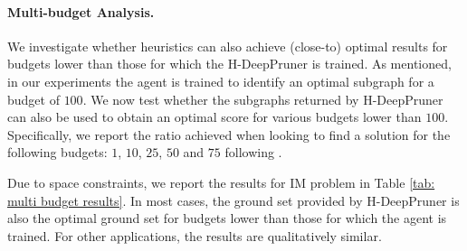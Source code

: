 \documentclass[letterpaper]{article} %
\begin{document}
\paragraph{Multi-budget Analysis.} We investigate whether heuristics can also achieve (close-to) optimal results for budgets lower than those for which the H-DeepPruner is trained. As mentioned, in
our experiments the agent is trained to identify an optimal
subgraph for a budget of $100$. We now test whether the
subgraphs returned by H-DeepPruner can also be used to obtain an
optimal score for various budgets lower than $100$. Specifically, we report the ratio achieved when looking to find a
solution for the following budgets: $1$, $10$, $25$, $50$ and $75$ following \cite{ireland2022lense}.

Due to space constraints, we report the results for IM problem in Table \ref{tab: multi budget results}. In most cases, the ground set provided by H-DeepPruner is also the optimal ground set for budgets lower than those for which the agent is trained. For other applications, the results are qualitatively similar.
\end{document}
